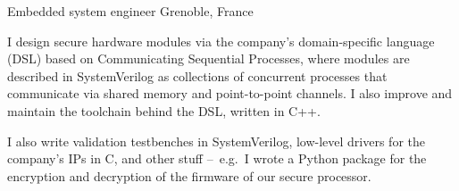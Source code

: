 
\begin{cventries}
\vspace{-5mm}

\cventry
{}
{\vspace{-9mm}Embedded system engineer } %
{\vspace{-9mm}Grenoble, France} %
{} %
{
\begin{cvitems}
\item{I design secure hardware modules via the company's domain-specific 
language (DSL) based on Communicating Sequential Processes, 
where modules are described in SystemVerilog as collections of concurrent 
processes that communicate via shared memory and point-to-point channels. I 
also improve and maintain the toolchain 
behind the DSL, written in C++.}
\item{I also write validation testbenches in SystemVerilog, low-level drivers 
for the company's IPs in C, and other stuff --~e.g.~I wrote a Python package 
for the encryption and decryption of the firmware of our secure processor.}
\end{cvitems}
}
\vspace{-5mm}


\end{cventries}
